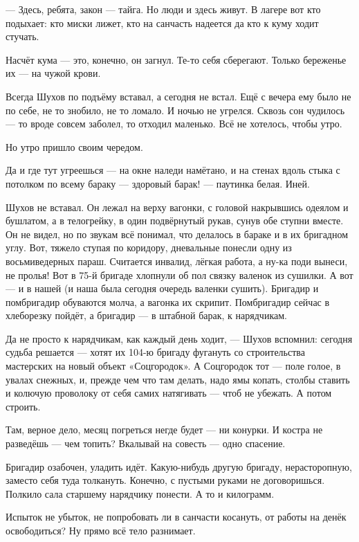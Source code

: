 --- Здесь, ребята, закон --- тайга. Но люди и здесь живут. В лагере вот кто подыхает: кто миски 
лижет, кто на санчасть надеется да кто к куму ходит стучать.

Насчёт кума --- это, конечно, он загнул. Те-то себя сберегают. Только береженье их --- на чужой 
крови.

Всегда Шухов по подъёму вставал, а сегодня не встал. Ещё с вечера ему было не по себе, не то 
знобило, не то ломало. И ночью не угрелся. Сквозь сон чудилось --- то вроде совсем заболел, то 
отходил маленько. Всё не хотелось, чтобы утро.

Но утро пришло своим чередом.

Да и где тут угреешься --- на окне наледи намётано, и на стенах вдоль стыка с потолком по всему 
бараку --- здоровый барак! --- паутинка белая. Иней.

Шухов не вставал. Он лежал на верху вагонки, с головой накрывшись одеялом и бушлатом, а в 
телогрейку, в один подвёрнутый рукав, сунув обе ступни вместе. Он не видел, но по звукам всё 
понимал, что делалось в бараке и в их бригадном углу. Вот, тяжело ступая по коридору, 
дневальные понесли одну из восьмиведерных параш. Считается инвалид, лёгкая работа, а ну-ка 
поди вынеси, не пролья! Вот в 75-й бригаде хлопнули об пол связку валенок из сушилки. А вот --- и 
в нашей (и наша была сегодня очередь валенки сушить). Бригадир и помбригадир обуваются молча, 
а вагонка их скрипит. Помбригадир сейчас в хлеборезку пойдёт, а бригадир --- в штабной барак, к 
нарядчикам.

Да не просто к нарядчикам, как каждый день ходит, --- Шухов вспомнил: сегодня судьба решается 
--- хотят их 104-ю бригаду фугануть со строительства мастерских на новый объект «Соцгородок». А 
Соцгородок тот --- поле голое, в увалах снежных, и, прежде чем что там делать, надо ямы копать, 
столбы ставить и колючую проволоку от себя самих натягивать --- чтоб не убежать. А потом 
строить.

Там, верное дело, месяц погреться негде будет --- ни конурки. И костра не разведёшь --- чем 
топить? Вкалывай на совесть --- одно спасение.

Бригадир озабочен, уладить идёт. Какую-нибудь другую бригаду, нерасторопную, заместо себя 
туда толкануть. Конечно, с пустыми руками не договоришься. Полкило сала старшему нарядчику 
понести. А то и килограмм.

Испыток не убыток, не попробовать ли в санчасти косануть, от работы на денёк освободиться? Ну 
прямо всё тело разнимает.

